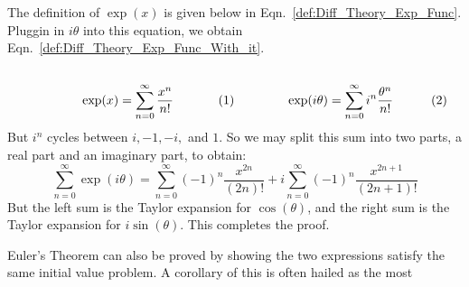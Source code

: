 \documentclass[crop=false,class=book,oneside]{standalone}
\begin{document}
            \begin{bproof}
                The definition of $\exp(x)$ is given below in
                Eqn.~\ref{def:Diff_Theory_Exp_Func}. Pluggin in
                $i\theta$ into this equation, we obtain
                Eqn.~\ref{def:Diff_Theory_Exp_Func_With_it}.
                \par
                \begin{subequations}
                    \begin{minipage}[b]{0.49\textwidth}
                    \centering
                    \begin{equation}
                        \label{def:Diff_Theory_Exp_Func}
                        \exp(x)=\sum_{n=0}^{\infty}
                        \frac{x^{n}}{n!}
                    \end{equation}
                \end{minipage}
                    \hfill
                    \begin{minipage}[b]{0.49\textwidth}
                    \centering
                    \begin{equation}
                        \label{def:Diff_Theory_Exp_Func_With_it}
                    \exp(i\theta)=\sum_{n=0}^{\infty}
                    i^{n}\frac{\theta^{n}}{n!}
                    \end{equation}
                \end{minipage}
                \end{subequations}
                \clearpage
                But $i^{n}$ cycles between $i,-1,-i,$
                and $1$. So
                we may split this sum into two parts,
                a real part
                and an imaginary part, to obtain:
                \begin{equation}
                    \sum_{n=0}^{\infty}\exp(i\theta)
                    =\sum_{n=0}^{\infty}(-1)^{n}
                    \frac{x^{2n}}{(2n)!}+
                    i\sum_{n=0}^{\infty}
                    (-1)^{n}\frac{x^{2n+1}}{(2n+1)!}
                \end{equation}
                But the left sum is the Taylor expansion for
                $\cos(\theta)$, and the right sum is the Taylor
                expansion for $i\sin(\theta)$.
                This completes the proof.
            \end{bproof}
            Euler's Theorem can also be proved by showing the two
            expressions satisfy the same initial value problem.
            A corollary of this is often hailed as the most
\end{document}
